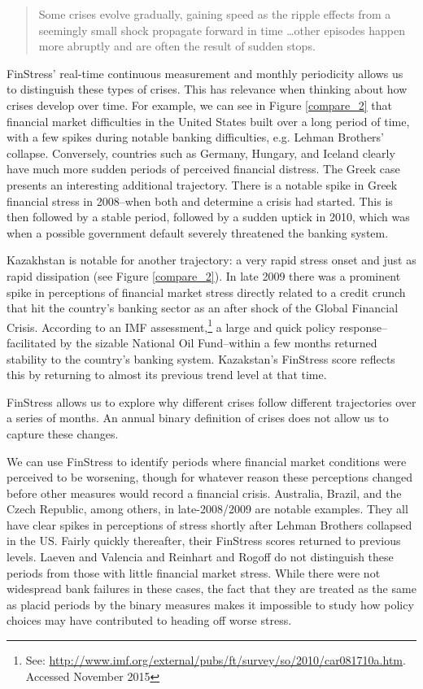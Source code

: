 \documentclass[]{article}
\begin{document}
\begin{quote}
    Some crises evolve gradually, gaining speed as the ripple effects from a seemingly small shock propagate forward in time \ldots other episodes happen more abruptly and are often the result of sudden stops.
\end{quote}

\noindent FinStress' real-time continuous measurement and monthly periodicity allows us to distinguish these types of crises. This has relevance when thinking about how crises develop over time. For example, we can see in Figure \ref{compare_2} that financial market difficulties in the United States built over a long period of time, with a few spikes during notable banking difficulties, e.g. Lehman Brothers' collapse. Conversely, countries such as Germany, Hungary, and Iceland clearly have much more sudden periods of perceived financial distress. The Greek case presents an interesting additional trajectory. There is a notable spike in Greek financial stress in 2008--when both \cite{Reinhart2009} and \cite{laeven2013} determine a crisis had started. This is then followed by a stable period, followed by a sudden uptick in 2010, which was when a possible government default severely threatened the banking system.

Kazakhstan is notable for another trajectory: a very rapid stress onset and just as rapid dissipation (see Figure \ref{compare_2}). In late 2009 there was a prominent spike in perceptions of financial market stress directly related to a credit crunch that hit the country's banking sector as an after shock of the Global Financial Crisis. According to an IMF assessment,\footnote{See: \url{http://www.imf.org/external/pubs/ft/survey/so/2010/car081710a.htm}. Accessed November 2015} a large and quick policy response--facilitated by the sizable National Oil Fund--within a few months returned stability to the country's banking system. Kazakstan's FinStress score reflects this by returning to almost its previous trend level at that time.

FinStress allows us to explore why different crises follow different trajectories over a series of months. An annual binary definition of crises does not allow us to capture these changes.

We can use FinStress to identify periods where financial market conditions were perceived to be worsening, though for whatever reason these perceptions changed before other measures would record a financial crisis. Australia, Brazil, and the Czech Republic, among others, in late-2008/2009 are notable examples. They all have clear spikes in perceptions of stress shortly after Lehman Brothers collapsed in the US. Fairly quickly thereafter, their FinStress scores returned to previous levels. Laeven and Valencia and Reinhart and Rogoff do not distinguish these periods from those with little financial market stress. While there were not widespread bank failures in these cases, the fact that they are treated as the same as placid periods by the binary measures makes it impossible to study how policy choices may have contributed to heading off worse stress.
\end{document}
